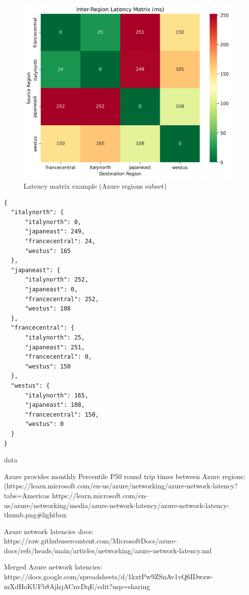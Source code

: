 \begin{figure}[H]
  \centering
  \includegraphics[width=0.75\linewidth]{images/latency_heatmap.png}
  \caption{Latency matrix example (Azure regions subset)}
  \label{fig:latency_matrix}
\end{figure}


\lstset{style=jsonstyle}
\begin{lstlisting}[caption={Latancy matrix example encoded in JSON format}, label={lst:latency_matrix_example}]
{
  "italynorth": {
      "italynorth": 0,
      "japaneast": 249,
      "francecentral": 24,
      "westus": 165
  },
  "japaneast": {
      "italynorth": 252,
      "japaneast": 0,
      "francecentral": 252,
      "westus": 108
  },
  "francecentral": {
      "italynorth": 25,
      "japaneast": 251,
      "francecentral": 0,
      "westus": 150
  },
  "westus": {
      "italynorth": 165,
      "japaneast": 108,
      "francecentral": 150,
      "westus": 0
  }
}

\end{lstlisting}


data

Azure provides monthly Percentile P50 round trip times between Azure regions:
(https://learn.microsoft.com/en-us/azure/networking/azure-network-latency?tabs=Americas%
https://learn.microsoft.com/en-us/azure/networking/media/azure-network-latency/azure-network-latency-thumb.png#lightbox 

Azure network latencies docs:
https://raw.githubusercontent.com/MicrosoftDocs/azure-docs/refs/heads/main/articles/networking/azure-network-latency.md

Merged Azure network latencies:
https://docs.google.com/spreadsheets/d/1kxtPw9ZSnAv1vQ6IDwzw-mXdHoKUFb8AjlsjACnvDqE/edit?usp=sharing 


